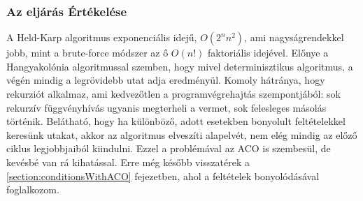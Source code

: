 \subsubsection{Az eljárás Értékelése}
\label{sssec:HeldKarpEvaluate}
A Held-Karp algoritmus exponenciális idejű, \(O(2^nn^2)\), ami nagyságrendekkel jobb, mint a brute-force módszer az ő \(O(n!)\) faktoriális idejével. Előnye a Hangyakolónia algoritmussal szemben, hogy mivel determinisztikus algoritmus, a végén mindig a legrövidebb utat adja eredményül. Komoly hátránya, hogy rekurziót alkalmaz, ami kedvezőtlen a programvégrehajtás szempontjából: sok rekurzív függvényhívás ugyanis megterheli a vermet, sok felesleges másolás történik. Belátható, hogy ha különböző, adott esetekben bonyolult feltételekkel keresünk utakat, akkor az algoritmus elveszíti alapelvét, nem elég mindig az előző ciklus legjobbjaiból kiindulni. Ezzel a problémával az ACO is szembesül, de kevésbé van rá kihatással. Erre még később visszatérek a \ref{section:conditionsWithACO} fejezetben, ahol a feltételek bonyolódásával foglalkozom.

